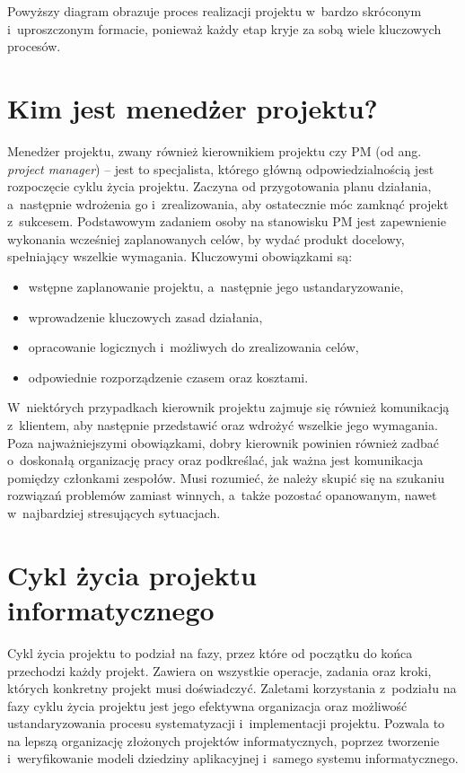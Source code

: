 \documentclass[oneside,polski,logo]{amuthesis}
\begin{document}
Powyższy diagram obrazuje proces realizacji projektu w~bardzo skróconym i~uproszczonym formacie, ponieważ każdy etap kryje za sobą wiele kluczowych procesów.

\section {Kim jest menedżer projektu?}
Menedżer projektu, zwany również kierownikiem projektu czy PM (od ang. \emph{project manager}) – jest to specjalista, którego główną odpowiedzialnością jest rozpoczęcie cyklu życia projektu. Zaczyna od przygotowania planu działania, a~następnie wdrożenia go i~zrealizowania, aby ostatecznie móc zamknąć projekt z~sukcesem. Podstawowym zadaniem osoby na stanowisku PM jest zapewnienie wykonania wcześniej zaplanowanych celów, by wydać produkt docelowy, spełniający wszelkie wymagania. Kluczowymi obowiązkami są:

\begin{itemize}
	\item wstępne zaplanowanie projektu, a~następnie jego ustandaryzowanie,
	\item wprowadzenie kluczowych zasad działania,
	\item opracowanie logicznych i~możliwych do zrealizowania celów,
	\item odpowiednie rozporządzenie czasem oraz kosztami. \\
\end{itemize}

W~niektórych przypadkach kierownik projektu zajmuje się również komunikacją z~klientem, aby następnie przedstawić oraz wdrożyć wszelkie jego wymagania. Poza najważniejszymi obowiązkami, dobry kierownik powinien również zadbać o~doskonałą organizację pracy oraz podkreślać, jak ważna jest komunikacja pomiędzy członkami zespołów. Musi rozumieć, że należy skupić się na szukaniu rozwiązań problemów zamiast winnych, a~także pozostać opanowanym, nawet w~najbardziej stresujących sytuacjach.

\section{Cykl życia projektu informatycznego}
Cykl życia projektu to podział na fazy, przez które od początku do końca przechodzi każdy projekt. Zawiera on wszystkie operacje, zadania oraz kroki, których konkretny projekt musi doświadczyć. Zaletami korzystania z~podziału na fazy cyklu życia projektu jest jego efektywna organizacja oraz możliwość ustandaryzowania procesu systematyzacji i~implementacji projektu. Pozwala to na lepszą organizację złożonych projektów informatycznych, poprzez tworzenie i~weryfikowanie modeli dziedziny aplikacyjnej i~samego systemu informatycznego. \cite{IO- Helion}
\end{document}
